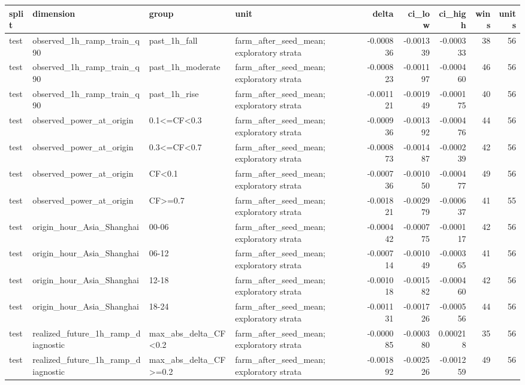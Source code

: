 \begin{tabular}{llllrrrrr}
\toprule
split & dimension & group & unit & delta & ci\_low & ci\_high & wins & units \\
\midrule
test & observed\_1h\_ramp\_train\_q90 & past\_1h\_fall & farm\_after\_seed\_mean; exploratory strata & -0.000836 & -0.001339 & -0.000333 & 38 & 56 \\
test & observed\_1h\_ramp\_train\_q90 & past\_1h\_moderate & farm\_after\_seed\_mean; exploratory strata & -0.000823 & -0.001197 & -0.000460 & 46 & 56 \\
test & observed\_1h\_ramp\_train\_q90 & past\_1h\_rise & farm\_after\_seed\_mean; exploratory strata & -0.001121 & -0.001949 & -0.000175 & 40 & 56 \\
test & observed\_power\_at\_origin & 0.1<=CF<0.3 & farm\_after\_seed\_mean; exploratory strata & -0.000936 & -0.001392 & -0.000476 & 44 & 56 \\
test & observed\_power\_at\_origin & 0.3<=CF<0.7 & farm\_after\_seed\_mean; exploratory strata & -0.000873 & -0.001487 & -0.000239 & 42 & 56 \\
test & observed\_power\_at\_origin & CF<0.1 & farm\_after\_seed\_mean; exploratory strata & -0.000736 & -0.001050 & -0.000477 & 49 & 56 \\
test & observed\_power\_at\_origin & CF>=0.7 & farm\_after\_seed\_mean; exploratory strata & -0.001821 & -0.002979 & -0.000637 & 41 & 55 \\
test & origin\_hour\_Asia\_Shanghai & 00-06 & farm\_after\_seed\_mean; exploratory strata & -0.000442 & -0.000775 & -0.000117 & 42 & 56 \\
test & origin\_hour\_Asia\_Shanghai & 06-12 & farm\_after\_seed\_mean; exploratory strata & -0.000714 & -0.001049 & -0.000365 & 41 & 56 \\
test & origin\_hour\_Asia\_Shanghai & 12-18 & farm\_after\_seed\_mean; exploratory strata & -0.001018 & -0.001582 & -0.000460 & 42 & 56 \\
test & origin\_hour\_Asia\_Shanghai & 18-24 & farm\_after\_seed\_mean; exploratory strata & -0.001131 & -0.001726 & -0.000556 & 44 & 56 \\
test & realized\_future\_1h\_ramp\_diagnostic & max\_abs\_delta\_CF<0.2 & farm\_after\_seed\_mean; exploratory strata & -0.000085 & -0.000380 & 0.000218 & 35 & 56 \\
test & realized\_future\_1h\_ramp\_diagnostic & max\_abs\_delta\_CF>=0.2 & farm\_after\_seed\_mean; exploratory strata & -0.001892 & -0.002526 & -0.001259 & 49 & 56 \\

\end{tabular}
